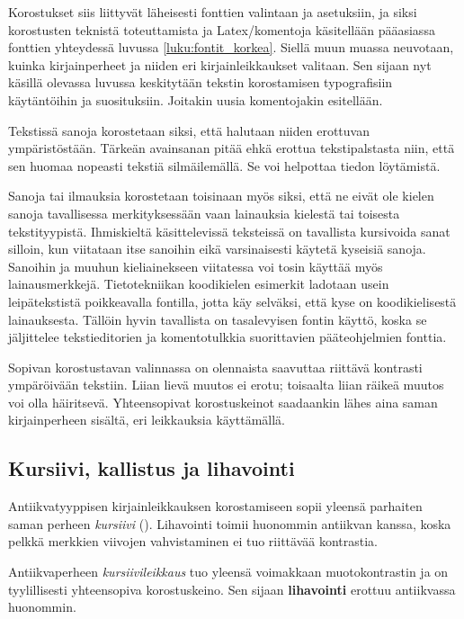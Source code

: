 Korostukset siis liittyvät läheisesti fonttien valintaan ja asetuksiin,
ja siksi korostusten teknistä toteuttamista ja Latex\-/komentoja
käsitellään pääasiassa fonttien yhteydessä luvussa
\ref{luku:fontit_korkea}.  Siellä muun muassa neuvotaan,
kuinka kirjainperheet ja niiden eri kirjainleikkaukset valitaan. Sen
sijaan nyt käsillä olevassa luvussa keskitytään tekstin korostamisen
typografisiin käytäntöihin ja suosituksiin. Joitakin uusia komentojakin
esitellään.

Tekstissä sanoja korostetaan siksi, että halutaan niiden erottuvan
ympäristöstään. Tärkeän avainsanan pitää ehkä erottua tekstipalstasta
niin, että sen huomaa nopeasti tekstiä silmäilemällä. Se voi helpottaa
tiedon löytämistä.

Sanoja tai ilmauksia korostetaan toisinaan myös siksi, että ne eivät ole
kielen sanoja tavallisessa merkityksessään vaan lainauksia kielestä tai
toisesta tekstityypistä. Ihmiskieltä käsittelevissä teksteissä on
tavallista kursivoida sanat silloin, kun viitataan itse sanoihin eikä
varsinaisesti käytetä kyseisiä sanoja. Sanoihin ja muuhun kieliainekseen
viitatessa voi tosin käyttää myös lainausmerkkejä. Tietotekniikan
koodikielen esimerkit ladotaan usein leipätekstistä poikkeavalla
fontilla, jotta käy selväksi, että kyse on koodikielisestä lainauksesta.
Tällöin hyvin tavallista on tasalevyisen fontin käyttö, koska se
jäljittelee tekstieditorien ja komentotulkkia suorittavien
pääteohjelmien fonttia.

Sopivan korostustavan valinnassa on olennaista saavuttaa riittävä
kontrasti ympäröivään tekstiin. Liian lievä muutos ei erotu; toisaalta
liian räikeä muutos voi olla häiritsevä. Yhteensopivat korostuskeinot
saadaankin lähes aina saman kirjainperheen sisältä, eri leikkauksia
käyttämällä.

\subsection{Kursiivi, kallistus ja lihavointi}
\label{luku:peruskorostukset}

Antiikvatyyppisen kirjainleikkauksen korostamiseen sopii yleensä
parhaiten saman perheen \textit{kursiivi} ().
Lihavointi toimii huonommin antiikvan kanssa, koska pelkkä merkkien
viivojen vahvistaminen ei tuo riittävää kontrastia.

\begin{tulossis}
  \rmfamily Antiikvaperheen \textit{kursiivileikkaus} tuo yleensä
  voimakkaan muotokontrastin ja on tyylillisesti yhteensopiva
  korostuskeino. Sen sijaan \textbf{lihavointi} erottuu antiikvassa
  huonommin.
\end{tulossis}

